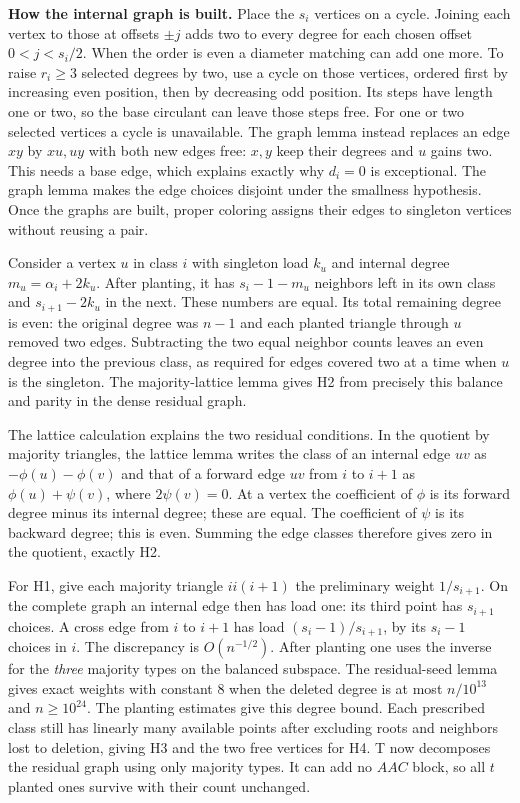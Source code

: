 \documentclass[english,11pt,a4paper]{article}
\begin{document}
\textbf{How the internal graph is built.} Place the \(s_i\) vertices on a cycle. Joining each vertex to those at offsets \(\pm j\) adds two to every degree for each chosen offset \(0<j<s_i/2\). When the order is even a diameter matching can add one more. To raise \(r_i\ge3\) selected degrees by two, use a cycle on those vertices, ordered first by increasing even position, then by decreasing odd position. Its steps have length one or two, so the base circulant can leave those steps free. For one or two selected vertices a cycle is unavailable. The graph lemma instead replaces an edge \(xy\) by \(xu,uy\) with both new edges free: \(x,y\) keep their degrees and \(u\) gains two. This needs a base edge, which explains exactly why \(d_i=0\) is exceptional. The graph lemma makes the edge choices disjoint under the smallness hypothesis. Once the graphs are built, proper coloring assigns their edges to singleton vertices without reusing a pair.

Consider a vertex \(u\) in class \(i\) with singleton load \(k_u\) and internal degree \(m_u=\alpha_i+2k_u\). After planting, it has \(s_i-1-m_u\) neighbors left in its own class and \(s_{i+1}-2k_u\) in the next. These numbers are equal. Its total remaining degree is even: the original degree was \(n-1\) and each planted triangle through \(u\) removed two edges. Subtracting the two equal neighbor counts leaves an even degree into the previous class, as required for edges covered two at a time when \(u\) is the singleton. The majority-lattice lemma gives H2 from precisely this balance and parity in the dense residual graph.

The lattice calculation explains the two residual conditions. In the quotient by majority triangles, the lattice lemma writes the class of an internal edge \(uv\) as \(-\phi(u)-\phi(v)\) and that of a forward edge \(uv\) from \(i\) to \(i+1\) as \(\phi(u)+\psi(v)\), where \(2\psi(v)=0\). At a vertex the coefficient of \(\phi\) is its forward degree minus its internal degree; these are equal. The coefficient of \(\psi\) is its backward degree; this is even. Summing the edge classes therefore gives zero in the quotient, exactly H2.

For H1, give each majority triangle \(ii(i+1)\) the preliminary weight \(1/s_{i+1}\). On the complete graph an internal edge then has load one: its third point has \(s_{i+1}\) choices. A cross edge from \(i\) to \(i+1\) has load \((s_i-1)/s_{i+1}\), by its \(s_i-1\) choices in \(i\). The discrepancy is \(O(n^{-1/2})\). After planting one uses the inverse for the \emph{three} majority types on the balanced subspace. The residual-seed lemma gives exact weights with constant 8 when the deleted degree is at most \(n/10^{13}\) and \(n\ge10^{24}\). The planting estimates give this degree bound. Each prescribed class still has linearly many available points after excluding roots and neighbors lost to deletion, giving H3 and the two free vertices for H4. T now decomposes the residual graph using only majority types. It can add no \(AAC\) block, so all \(t\) planted ones survive with their count unchanged.
\end{document}
